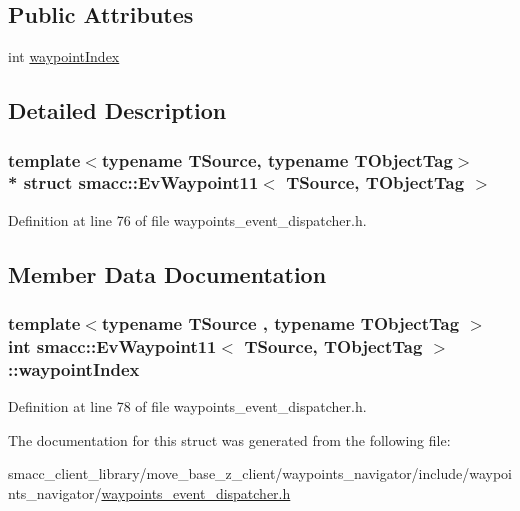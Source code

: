 \subsection*{Public Attributes}
\begin{DoxyCompactItemize}
\item 
int \hyperlink{structsmacc_1_1EvWaypoint11_a7d7cef064cf04fdb94001da3a519097f}{waypoint\+Index}
\end{DoxyCompactItemize}


\subsection{Detailed Description}
\subsubsection*{template$<$typename T\+Source, typename T\+Object\+Tag$>$\\*
struct smacc\+::\+Ev\+Waypoint11$<$ T\+Source, T\+Object\+Tag $>$}



Definition at line 76 of file waypoints\+\_\+event\+\_\+dispatcher.\+h.



\subsection{Member Data Documentation}
\subsubsection[{\texorpdfstring{waypoint\+Index}{waypointIndex}}]{\setlength{\rightskip}{0pt plus 5cm}template$<$typename T\+Source , typename T\+Object\+Tag $>$ int {\bf smacc\+::\+Ev\+Waypoint11}$<$ T\+Source, T\+Object\+Tag $>$\+::waypoint\+Index}\hypertarget{structsmacc_1_1EvWaypoint11_a7d7cef064cf04fdb94001da3a519097f}{}\label{structsmacc_1_1EvWaypoint11_a7d7cef064cf04fdb94001da3a519097f}


Definition at line 78 of file waypoints\+\_\+event\+\_\+dispatcher.\+h.



The documentation for this struct was generated from the following file\+:\begin{DoxyCompactItemize}
\item 
smacc\+\_\+client\+\_\+library/move\+\_\+base\+\_\+z\+\_\+client/waypoints\+\_\+navigator/include/waypoints\+\_\+navigator/\hyperlink{waypoints__event__dispatcher_8h}{waypoints\+\_\+event\+\_\+dispatcher.\+h}\end{DoxyCompactItemize}
